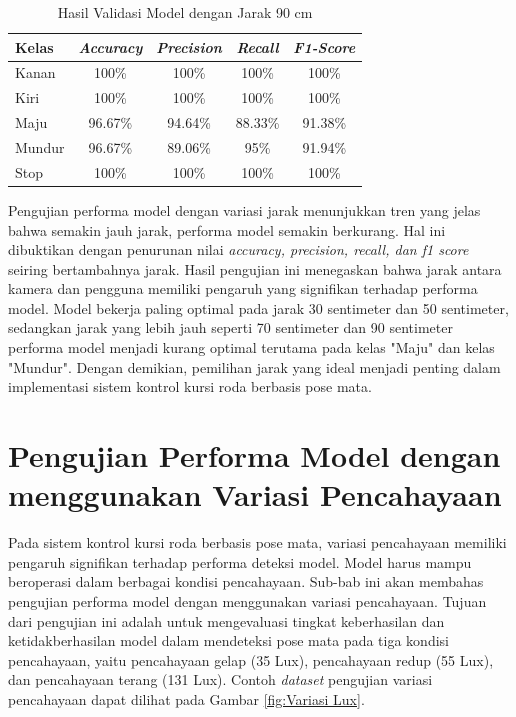 \begin{longtable}{|l|c|c|c|c|}
  \caption{Hasil Validasi Model dengan Jarak 90 cm}
  \label{tb:vs_model6} \\
  \hline
  \rowcolor[HTML]{C0C0C0} 
  \textbf{Kelas} & \textbf{\emph{Accuracy}} & \textbf{\emph{Precision}} & \textbf{\emph{Recall}} & \textbf{\emph{F1-Score}} \\ \hline
  Kanan    & 100\%            & 100\%             & 100\%           & 100\%            \\ \hline
  Kiri     & 100\%          & 100\%           & 100\%           & 100\%           \\ \hline
  Maju      & 96.67\%          & 94.64\%           & 88.33\%          & 91.38\%          \\ \hline
  Mundur     & 96.67\%            & 89.06\%             & 95\%           & 91.94\%            \\ \hline
  Stop  & 100\%            & 100\%             & 100\%           & 100\%            \\ \hline
\end{longtable}

Pengujian performa model dengan variasi jarak menunjukkan tren yang jelas bahwa semakin jauh jarak, performa model semakin berkurang. Hal ini dibuktikan dengan penurunan nilai \emph{accuracy, precision, recall, dan f1 score} seiring bertambahnya jarak. Hasil pengujian ini menegaskan bahwa jarak antara kamera dan pengguna memiliki pengaruh yang signifikan terhadap performa model. Model bekerja paling optimal pada jarak 30 sentimeter dan 50 sentimeter, sedangkan jarak yang lebih jauh seperti 70 sentimeter dan 90 sentimeter performa model menjadi kurang optimal terutama pada kelas "Maju" dan kelas "Mundur". Dengan demikian, pemilihan jarak yang ideal menjadi penting dalam implementasi sistem kontrol kursi roda berbasis pose mata.

\section{Pengujian Performa Model dengan menggunakan Variasi Pencahayaan}

Pada sistem kontrol kursi roda berbasis pose mata, variasi pencahayaan memiliki pengaruh signifikan terhadap performa deteksi model. Model harus mampu beroperasi dalam berbagai kondisi pencahayaan. Sub-bab ini akan membahas pengujian performa model dengan menggunakan variasi pencahayaan. Tujuan dari pengujian ini adalah untuk mengevaluasi tingkat keberhasilan dan ketidakberhasilan model dalam mendeteksi pose mata pada tiga kondisi pencahayaan, yaitu pencahayaan gelap (35 Lux), pencahayaan redup (55 Lux), dan pencahayaan terang (131 Lux). Contoh \emph{dataset} pengujian variasi pencahayaan dapat dilihat pada Gambar \ref{fig:Variasi Lux}.
 
